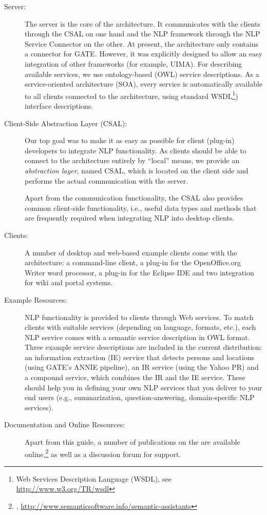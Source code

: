 \begin{description}
\item[Server:] The server is the core of the architecture.  It
  communicates with the clients through the CSAL on one hand and
  the NLP framework through the NLP Service Connector on the other.
  At present, the architecture only contains a connector for
  GATE. However, it was explicitly designed to allow an easy
  integration of other frameworks (for example, UIMA). For describing
  available services, we use ontology-based (OWL) service
  descriptions. As a service-oriented architecture (SOA), every
  service is automatically available to all clients connected to the
  architecture, using standard WSDL\footnote{Web Services Description
    Language (WSDL), see \url{http://www.w3.org/TR/wsdl}}) interface
  descriptions.

\item[Client-Side Abstraction Layer (CSAL):] Our top goal was to make
  it as easy as possible for client (plug-in) developers to integrate
  NLP functionality. As clients should be able to connect to the
  architecture entirely by ``local'' means, we provide an
  \emph{abstraction layer}, named CSAL, which is located on the client
  side and performs the actual communication with the server.

  Apart from the communication functionality, the CSAL also provides
  common client-side functionality, i.e., useful data types and
  methods that are frequently required when integrating NLP into
  desktop clients.

\item[Clients:] A number of desktop and web-based example clients come with the architecture: a
  command-line client, a plug-in for the OpenOffice.org Writer word
  processor, a plug-in for the Eclipse IDE and two integration for wiki and portal systems. 

\item[Example Resources:] NLP functionality is provided to clients
  through Web services. To match clients with suitable services
  (depending on language, formats, etc.), each NLP service comes with
  a semantic service description in OWL format. Three example service
  descriptions are included in the current distribution: an
  information extraction (IE) service that detects persons and locations
  (using GATE's ANNIE pipeline), an IR service (using the Yahoo PR)
  and a compound service, which combines the IR and the IE
  service. These should help you in defining your own NLP services
  that you deliver to your end users (e.g., summarization,
  question-answering, domain-specific NLP services).

\item[Documentation and Online Resources:] Apart from this guide, a
  number of publications on the \sa are available
  online,\footnote{\sa,
    \url{http://www.semanticsoftware.info/semantic-assistants}} as
  well as a discussion forum for support.
\end{description}


